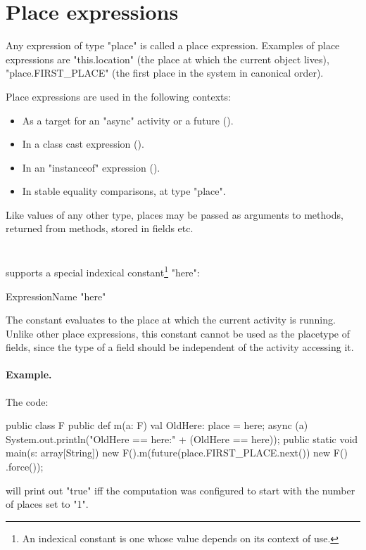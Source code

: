 \section{Place expressions}
Any expression of type \xcd"place" is called a place expression. 
Examples of place expressions are \xcd"this.location" (the place
at which the current object lives), \xcd"place.FIRST_PLACE"
(the first place in the system in canonical order). 

Place expressions are used in the following contexts: 
\begin{itemize}
\item As a target for an \xcd"async" activity or a future
().
\item In a class cast expression  ().
\item In an \xcd"instanceof" expression ().
\item In stable equality comparisons, at type \xcd"place".
\end{itemize}

Like values of any other type, places may be passed as arguments
to methods, returned from methods, stored in fields etc.

\section{}\label{Here}
\Xten{} supports a special indexical constant\footnote{
An indexical constant is one whose value depends on its context
of use.} \xcd"here":
\begin{grammar}
ExpressionName \: \xcd"here" \\
\end{grammar}
The constant evaluates to the place at which the current activity is
running. Unlike other place expressions, this constant cannot be 
used as the placetype of fields, since the type of a field 
should be independent of the activity accessing it.

\paragraph{Example.}
The code:
\begin{xten}
public class F {
  public def m(a: F) {
    val OldHere: place = here;
    async (a) {
      System.out.println("OldHere == here:" 
                         + (OldHere == here));
    }
  }
  public static void main(s: array[String]) {
    new F().m(future(place.FIRST_PLACE.next())
              { new F() }.force());
  }
}  
\end{xten}
\noindent will print out \xcd"true" iff the computation was configured
to start with the number of places set to \xcd"1". 


